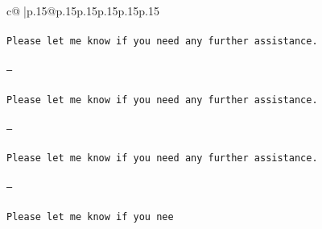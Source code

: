 \documentclass{article}
\begin{document}
{\begin{supertabular}{c@{$\;$}|p{.15\linewidth}@{}p{.15\linewidth}p{.15\linewidth}p{.15\linewidth}p{.15\linewidth}p{.15\linewidth}}
{{{\\ \tt \\ \tt Please let me know if you need any further assistance. \\ \tt \\ \tt ---\\ \tt \\ \tt Please let me know if you need any further assistance. \\ \tt \\ \tt ---\\ \tt \\ \tt Please let me know if you need any further assistance. \\ \tt \\ \tt ---\\ \tt \\ \tt Please let me know if you nee}}}
\end{supertabular}}
\end{document}
